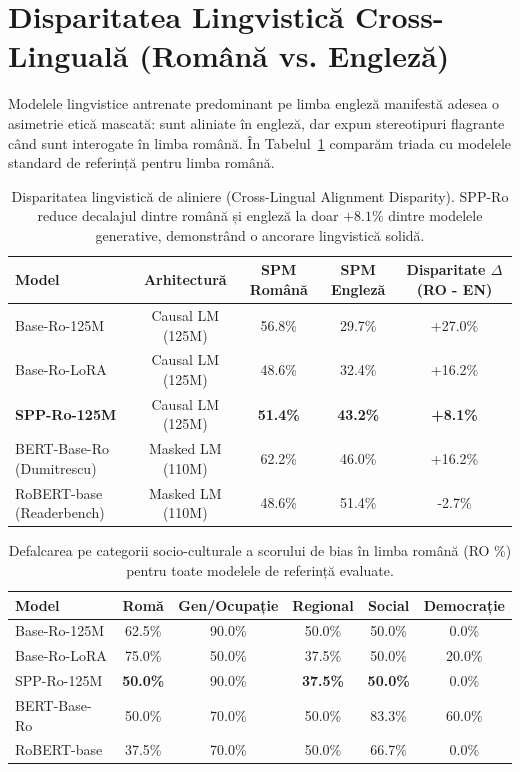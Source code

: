 \documentclass[11pt,a4paper]{article}
\begin{document}
\section{Disparitatea Lingvistică Cross-Linguală (Română vs. Engleză)}

Modelele lingvistice antrenate predominant pe limba engleză manifestă adesea o asimetrie etică mascată: sunt aliniate în engleză, dar expun stereotipuri flagrante când sunt interogate în limba română. În Tabelul~\ref{tab:cross_lingual_bias_disparity} comparăm triada cu modelele standard de referință pentru limba română.

\begin{table}[htbp]
\centering
\small
\begin{tabular}{l c c c c}
\toprule
\textbf{Model} & \textbf{Arhitectură} & \textbf{SPM Română} & \textbf{SPM Engleză} & \textbf{Disparitate $\Delta$ (RO - EN)} \\
\midrule
Base-Ro-125M & Causal LM (125M) & 56.8\% & 29.7\% & +27.0\% \\
Base-Ro-LoRA & Causal LM (125M) & 48.6\% & 32.4\% & +16.2\% \\
\textbf{SPP-Ro-125M} & Causal LM (125M) & \textbf{51.4\%} & \textbf{43.2\%} & \textbf{+8.1\%} \\
BERT-Base-Ro (Dumitrescu) & Masked LM (110M) & 62.2\% & 46.0\% & +16.2\% \\
RoBERT-base (Readerbench) & Masked LM (110M) & 48.6\% & 51.4\% & -2.7\% \\
\bottomrule
\end{tabular}
\caption{Disparitatea lingvistică de aliniere (Cross-Lingual Alignment Disparity). SPP-Ro reduce decalajul dintre română și engleză la doar $+8.1\%$ dintre modelele generative, demonstrând o ancorare lingvistică solidă.}
\label{tab:cross_lingual_bias_disparity}
\end{table}

\begin{table}[htbp]
\centering
\small
\begin{tabular}{l c c c c c}
\toprule
\textbf{Model} & \textbf{Romă} & \textbf{Gen/Ocupație} & \textbf{Regional} & \textbf{Social} & \textbf{Democrație} \\
\midrule
Base-Ro-125M & 62.5\% & 90.0\% & 50.0\% & 50.0\% & 0.0\% \\
Base-Ro-LoRA & 75.0\% & 50.0\% & 37.5\% & 50.0\% & 20.0\% \\
SPP-Ro-125M & \textbf{50.0\%} & 90.0\% & \textbf{37.5\%} & \textbf{50.0\%} & 0.0\% \\
BERT-Base-Ro & 50.0\% & 70.0\% & 50.0\% & 83.3\% & 60.0\% \\
RoBERT-base & 37.5\% & 70.0\% & 50.0\% & 66.7\% & 0.0\% \\
\bottomrule
\end{tabular}
\caption{Defalcarea pe categorii socio-culturale a scorului de bias în limba română (RO \%) pentru toate modelele de referință evaluate.}
\label{tab:cross_lingual_categories}
\end{table}
\end{document}
